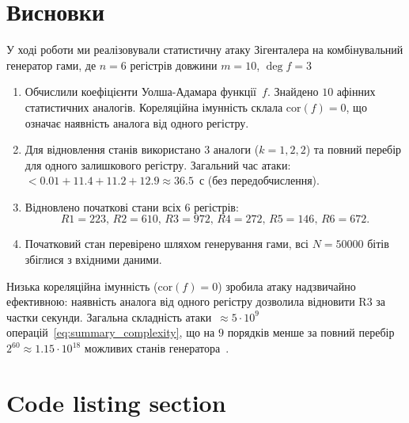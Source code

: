 \section{Висновки}

У ході роботи ми реалізовували статистичну атаку Зігенталера на комбінувальний генератор гами, де $n = 6$ 
регістрів довжини $m = 10$, $\deg f = 3$
\begin{enumerate}
    \item Обчислили коефіцієнти Уолша-Адамара функції~$f$. Знайдено $10$ афінних статистичних аналогів. 
        Кореляційна імунність склала $\mathrm{cor}(f) = 0$, що означає наявність аналога від одного регістру.
    \item Для відновлення станів використано 3 аналоги ($k = 1, 2, 2$) та повний перебір для одного залишкового 
        регістру. Загальний час атаки: $< 0.01 + 11.4 + 11.2 + 12.9 \approx 36.5$~с (без передобчислення).
    \item Відновлено початкові стани всіх 6 регістрів:
        \begin{equation*}
            R1 = 223, \, R2 = 610, \, R3 = 972, \, R4 = 272, \, R5 = 146, \, R6 =672.
        \end{equation*}
    \item Початковий стан перевірено шляхом генерування гами, всі $N = 50000$ бітів збіглися з вхідними даними.
\end{enumerate}

Низька кореляційна імунність ($\mathrm{cor}(f) = 0$) зробила атаку надзвичайно ефективною: наявність аналога від одного 
регістру дозволила відновити R3 за частки секунди. Загальна складність атаки~$\approx 5 \cdot 10^9$ операцій~\eqref{eq:summary_complexity}, 
що на $9$ порядків менше за повний перебір $2^{60} \approx 1.15 \cdot 10^{18}$ можливих станів генератора~\cite{carlet2010}.

\section{Code listing section}



